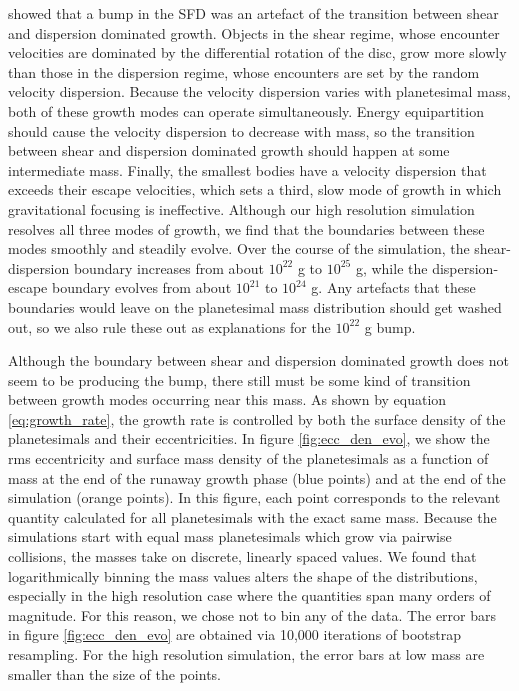 \cite{wetherill11} showed that a bump in the SFD was an artefact of the transition between shear and dispersion dominated 
growth. Objects in the shear regime, whose encounter velocities are dominated by the differential rotation of the disc, grow more 
slowly than those in the dispersion regime, whose encounters are set by the random velocity dispersion. Because the velocity 
dispersion varies with planetesimal mass, both of these growth modes can operate simultaneously. Energy equipartition should 
cause the velocity dispersion to decrease with mass, so the transition between shear and dispersion dominated growth should 
happen at some intermediate mass. Finally, the smallest bodies have a velocity dispersion that exceeds their escape velocities, 
which sets a third, slow mode of growth in which gravitational focusing is ineffective. Although our high resolution simulation 
resolves all three modes of growth, we find that the boundaries between these modes smoothly and steadily evolve. Over the 
course of the simulation, the shear-dispersion boundary increases from about $10^{22}$ g to $10^{25}$ g, while the dispersion-
escape boundary evolves from about $10^{21}$ to $10^{24}$ g. Any artefacts that these boundaries would leave on the 
planetesimal mass distribution should get washed out, so we also rule these out as explanations for the $10^{22}$ g bump.

Although the boundary between shear and dispersion dominated growth does not seem to be producing the bump, there still 
must be some kind of transition between growth modes occurring near this mass. As shown by equation \ref{eq:growth_rate}, 
the growth rate is controlled by both the surface density of the planetesimals and their eccentricities. In figure 
\ref{fig:ecc_den_evo}, we show the rms eccentricity and surface mass density of the planetesimals as a function of mass at the 
end of the runaway growth phase (blue points) and at the end of the simulation (orange points). In this figure, each point 
corresponds to the relevant quantity calculated for all planetesimals with the exact same mass. Because the simulations start 
with equal mass planetesimals which grow via pairwise collisions, the masses take on discrete, linearly spaced values. We found 
that logarithmically binning the mass values alters the shape of the distributions, especially in the high resolution case where the 
quantities span many orders of magnitude. For this reason, we chose not to bin any of the data. The error bars in figure 
\ref{fig:ecc_den_evo} are obtained via 10,000 iterations of bootstrap resampling. For the high resolution simulation, the error 
bars at low mass are smaller than the size of the points.

